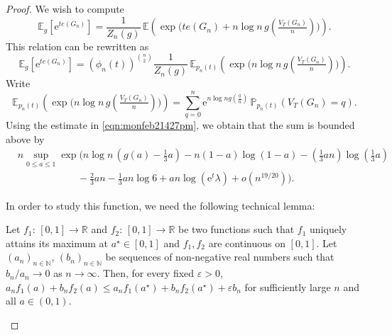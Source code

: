 \documentclass[10pt,a4paper]{amsart}
\newcommand{\e}{{\mathrm e}}
\begin{document}
\begin{proof} We wish to compute 
	\begin{equation}
	\mathbb{E}_g\left[\e^{te(G_n)}\right] = \frac{1}{Z_n(g)}\, 
	\mathbb{E}\left(\exp{\big(te(G_n)+ n\log{n}\, g(\tfrac{V_{ T}(G_n)}{n})\big)}\right). 
	\end{equation}
This relation can be rewritten as 
	\begin{equation}
	\mathbb{E}_g\left[\e^{te(G_n)}\right] = \left(\phi_n(t)\right)^{{n\choose 2}} \frac{1}{Z_n(g)}\, 
	\mathbb{E}_{p_n(t)}\left(\exp{\big( n\log{n}\, g(\tfrac{V_{ T}(G_n)}{n})\big)}\right). 
	\end{equation}
Write
	\begin{equation}
	\mathbb{E}_{p_n(t)}\left(\exp{\big(n\log{n}\, g(\tfrac{V_{ T}(G_n)}{n})\big)}\right) 
	= \sum_{q=0}^n \mathrm{e}^{n\log{n} g\left(\frac{q}{n}\right)}\, \mathbb{P}_{p_n(t)}(V_{T}(G_n)=q).
	\end{equation}
Using the estimate in \eqref{eqn:monfeb21427pm}, we obtain that the sum is bounded above by
	\begin{equation}
	\begin{aligned}
	&n \sup_{0\leq a \leq 1}\exp\Big(n\log{n}\,(g(a)- \tfrac13a) -n(1-a) \log(1-a) - (\tfrac13an)\log(\tfrac13a)\\
	&\qquad\qquad\qquad -\tfrac23 an -\tfrac13 an\log{6}+an\log{(\e^t \lambda)} +o(n^{19/20})\Big).
	\end{aligned}
	\end{equation}
	
In order to study this function, we need the following technical lemma:

\begin{lem}
\label{lem:may31121am}
Let $f_1\colon\,[0,1]\rightarrow \mathbb{R}$ and $f_2\colon\,[0,1]\rightarrow \mathbb{R}$ be two functions such that $f_1$ uniquely attains its maximum at $a^\star \in [0,1]$ and $f_1, f_2$ are continuous on $[0,1]$. Let $(a_n)_{n\in\mathbb{N}}$,  $(b_n)_{n\in\mathbb{N}}$ be sequences of non-negative real numbers such that $b_n/a_n \rightarrow 0$ as $n\to \infty$. Then, for every fixed $\varepsilon>0$, $a_nf_1(a)+b_nf_2(a) \leq a_nf_1(a^\star)+b_nf_2(a^\star) +\varepsilon b_n$ for sufficiently large $n$ and all $a\in(0,1)$.
\end{lem}


\end{proof}
\end{document}
